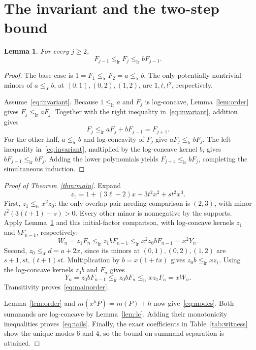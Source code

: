 \documentclass[11pt]{article}
\newtheorem{lemma}[theorem]{Lemma}
\newcommand{\lr}{\mathrel{\leq_{\mathrm{lr}}}}
\begin{document}
\section{The invariant and the two-step bound}

\begin{lemma}\label{lem:invariant}
For every $j\geq2$,
\begin{equation}\label{eq:invariant}
 F_{j-1}\lr F_j\lr bF_{j-1}.
\end{equation}
\end{lemma}
\begin{proof}
The base case is $1=F_1\lr F_2=a\lr b$. The only potentially
nontrivial minors of $a\lr b$, at $(0,1),(0,2),(1,2)$, are
$1,t,t^2$, respectively.

Assume~\eqref{eq:invariant}. Because $1\lr a$ and $F_j$ is
log-concave, Lemma~\ref{lem:order} gives $F_j\lr aF_j$.
Together with the right inequality in~\eqref{eq:invariant}, addition
gives
\[
 F_j\lr aF_j+bF_{j-1}=F_{j+1}.
\]
For the other half, $a\lr b$ and log-concavity of $F_j$ give
$aF_j\lr bF_j$. The left inequality in~\eqref{eq:invariant},
multiplied by the log-concave kernel $b$, gives
$bF_{j-1}\lr bF_j$. Adding the lower polynomials yields
$F_{j+1}\lr bF_j$, completing the simultaneous induction.
\end{proof}

\begin{proof}[Proof of Theorem~\ref{thm:main}]
Expand
\[
 z_1=1+(3\ell-2)x+3t^2x^2+st^2x^3.
\]
First, $z_1\lr x^2z_0$: the only overlap pair needing comparison is
$(2,3)$, with minor $t^2(3(t+1)-s)>0$. Every other minor is
nonnegative by the supports. Apply Lemma~\ref{lem:invariant} and this
initial-factor comparison, with log-concave kernels $z_1$ and
$bF_{n-1}$, respectively:
\begin{equation}\label{eq:chain1}
 W_n=z_1F_n\lr z_1bF_{n-1}\lr x^2z_0bF_{n-1}=x^2Y_n.
\end{equation}
Second, $z_0\lr d=a+2x$, since its minors at
$(0,1),(0,2),(1,2)$ are $s+1,st,(t+1)st$. Multiplication by
$b=x(1+tx)$ gives $z_0b\lr xz_1$. Using the log-concave kernels
$z_0b$ and $F_n$ gives
\begin{equation}\label{eq:chain2}
 Y_n=z_0bF_{n-1}\lr z_0bF_n\lr xz_1F_n=xW_n.
\end{equation}
Transitivity proves~\eqref{eq:mainorder}.

Lemma~\ref{lem:order} and $m(x^hP)=m(P)+h$ now give~\eqref{eq:modes}.
Both summands are log-concave by Lemma~\ref{lem:lc}. Adding their
monotonicity inequalities proves~\eqref{eq:tails}. Finally, the exact
coefficients in Table~\ref{tab:witness} show the unique modes $6$ and
$4$, so the bound on summand separation is attained.
\end{proof}
\end{document}
